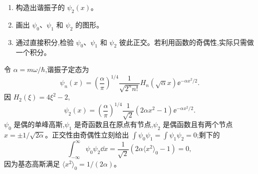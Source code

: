 \begin{question}
\begin{enumerate}
\item 构造出谐振子的 $\psi_2(x)$。
\item 画出 $\psi_0$、$\psi_1$ 和 $\psi_2$ 的图形。
\item 通过直接积分,检验 $\psi_0$、$\psi_1$ 和 $\psi_2$ 彼此正交。若利用函数的奇偶性,实际只需做一个积分。
\end{enumerate}
\end{question}
\begin{solution}
令 $\alpha=m\omega/\hbar$,谐振子定态为
\[
\psi_n(x)=\left(\frac{\alpha}{\pi}\right)^{1/4}\frac{1}{\sqrt{2^n n!}}H_n(\sqrt\alpha x)\ee^{-\alpha x^2/2}.
\]
因 $H_2(\xi)=4\xi^2-2$,
\[
\psi_2(x)=\left(\frac{\alpha}{\pi}\right)^{1/4}\frac1{\sqrt2}(2\alpha x^2-1)\ee^{-\alpha x^2/2}.
\]
$\psi_0$ 是偶的单峰高斯,$\psi_1$ 是奇函数且在原点有节点,$\psi_2$ 是偶函数且有两个节点 $x=\pm1/\sqrt{2\alpha}$。正交性由奇偶性立刻给出 $\int\psi_0\psi_1=\int\psi_1\psi_2=0$;剩下的
\[
\int_{-\infty}^{\infty}\psi_0\psi_2\dd x
=\frac1{\sqrt2}\left(2\alpha\langle x^2\rangle_0-1\right)=0,
\]
因为基态高斯满足 $\langle x^2\rangle_0=1/(2\alpha)$。
\end{solution}

